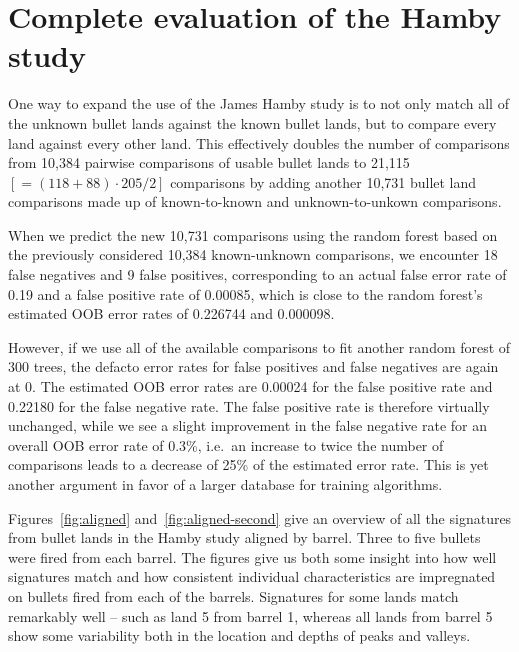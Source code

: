\documentclass[aoas]{imsart}\usepackage[]{graphicx}\usepackage[]{color}
\newcommand{\hh}[1]{{\color{magenta} #1}}
\begin{document}
\section{Complete evaluation of the Hamby study}\label{supp:extended}
One way to expand the use of the James Hamby study is to not only match all of the unknown bullet lands against the known bullet lands, but to compare every land against every other land. This effectively doubles the number of comparisons from 10,384 pairwise comparisons of usable bullet lands to 21,115 $\left[= (118+88)\cdot 205/2\right]$ comparisons by adding another 10,731 bullet land comparisons made up of known-to-known and unknown-to-unkown comparisons. 

When we predict the new 10,731 comparisons using the random forest based on the previously considered 10,384 known-unknown comparisons, we encounter 18 false negatives and 9 false positives, corresponding to an actual false error rate of 0.19 and a false positive rate of 0.00085, which is close to the random forest's estimated OOB error rates of 0.226744 and 0.000098. 

However, if we use all of the available comparisons to fit another random forest of 300 trees, the defacto error rates for false positives and false negatives are again at 0. The estimated OOB error rates are 0.00024 for the false positive rate and 0.22180 for the false negative rate. The false positive rate is therefore virtually unchanged, while we see a slight improvement in the false negative rate for an overall OOB error rate of 0.3\%, i.e.\ an increase to twice the number of comparisons leads to a decrease of 25\% of the estimated error rate. This is yet another argument in favor of a larger database for training algorithms.






Figures~\ref{fig:aligned} and~\ref{fig:aligned-second} give an overview of all the signatures from bullet lands in the Hamby study aligned by barrel. Three to five bullets were fired from each barrel. The figures give us both some insight into how well signatures match and how consistent individual characteristics are impregnated on bullets fired from each of the barrels. Signatures for some lands match remarkably well -- such as land 5 from barrel 1, whereas all lands from barrel 5 show some variability both in the location and depths of peaks and valleys.
\end{document}
